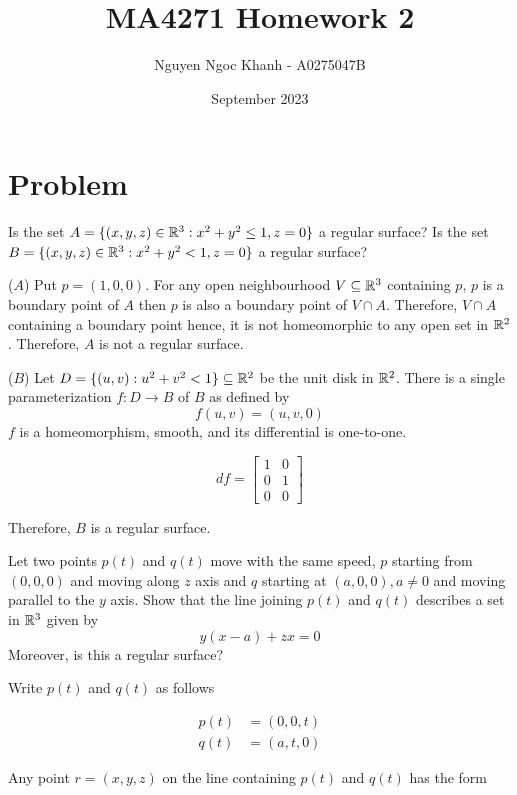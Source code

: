 \documentclass{article}
\title{
    MA4271 Homework 2
}
\author{Nguyen Ngoc Khanh - A0275047B}
\date{September 2023}
\begin{document}
\maketitle

\section{Problem}

\begin{problem}
    Is the set $A = \{(x, y, z) \in \mathbb{R}^3: x^2 + y^2 \leq 1, z = 0\}$ a regular surface? Is the set $B = \{(x, y, z) \in \mathbb{R}^3: x^2 + y^2 < 1, z = 0\}$ a regular surface?
\end{problem}

($A$)
Put $p = (1, 0, 0)$. For any open neighbourhood $V \subseteq \mathbb{R}^3$ containing $p$, $p$ is a boundary point of $A$ then $p$ is also a boundary point of $V \cap A$. Therefore, $V \cap A$ containing a boundary point hence, it is not homeomorphic to any open set in $\mathbb{R}^2$. Therefore, $A$ is not a regular surface.

($B$)
Let $D = \{(u, v): u^2 + v^2 < 1\} \subseteq \mathbb{R}^2$ be the unit disk in $\mathbb{R}^2$. There is a single parameterization $f: D \to B$ of $B$ as defined by 
\[
    f(u, v) = (u, v, 0)
\]
$f$ is a homeomorphism, smooth, and its differential is one-to-one.

\[
    df = 
    \begin{bmatrix}
    1 & 0\\
    0 & 1\\
    0 & 0
    \end{bmatrix}
\]

Therefore, $B$ is a regular surface.

\begin{problem}
    Let two points $p(t)$ and $q(t)$ move with the same speed, $p$ starting from $(0, 0, 0)$ and moving along $z$ axis and $q$ starting at $(a, 0, 0), a \neq 0$ and moving parallel to the $y$ axis. Show that the line joining $p(t)$ and $q(t)$ describes a set in $\mathbb{R}^3$ given by
    \[
        y(x-a) + zx = 0
    \]
    Moreover, is this a regular surface?
\end{problem}

Write $p(t)$ and $q(t)$ as follows

\begin{align*}
    p(t) &= (0, 0, t) \\
    q(t) &= (a, t, 0)
\end{align*}

Any point $r = (x, y, z)$ on the line containing $p(t)$ and $q(t)$ has the form
\end{document}
